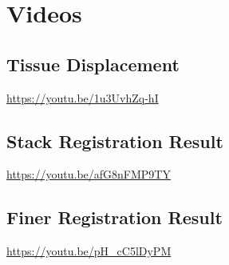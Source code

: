 \documentclass[12pt,oneside]{report}
\begin{document}
\renewcommand{\bibname}{References}
% 




\appendix

\chapter{Videos}

\section{Tissue Displacement}
\label{appendix:tissue-disp}
\url{https://youtu.be/1u3UvhZq-hI}

\section{Stack Registration Result}
\label{appendix:stack-reg-res}
\url{https://youtu.be/afG8nFMP9TY}

\section{Finer Registration Result}
\label{appendix:finer-reg-res}
\url{https://youtu.be/pH_cC5lDyPM}


\end{document}
